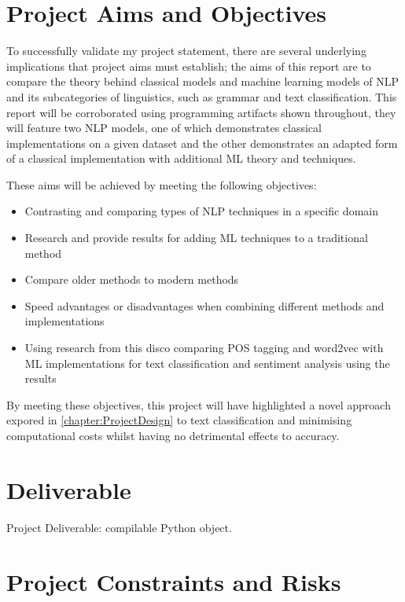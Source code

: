 \section{Project Aims and Objectives}

To successfully validate my project statement, there are several underlying implications that project aims must establish; the aims of this report are to compare the theory behind classical models and machine learning models of NLP and its subcategories of linguistics, such as grammar and text classification. This report will be corroborated using programming artifacts shown throughout, they will feature two NLP models, one of which demonstrates classical implementations on a given dataset and the other demonstrates an adapted form of a classical implementation with additional ML theory and techniques.

These aims will be achieved by meeting the following objectives:

\begin{itemize}
    \item Contrasting and comparing types of NLP techniques in a specific domain
    \item Research and provide results for adding ML techniques to a traditional method
	\item Compare older methods to modern methods
	\item Speed advantages or disadvantages when combining different methods and implementations
	\item Using research from this disco comparing POS tagging and word2vec with ML implementations for text classification and sentiment analysis using the results
\end{itemize}

By meeting these objectives, this project will have highlighted a novel approach expored in \autoref{chapter:ProjectDesign} to text classification and minimising computational costs whilst having no detrimental effects to accuracy.

\section{Deliverable}

Project Deliverable: compilable Python object.

\section{Project Constraints and Risks}

